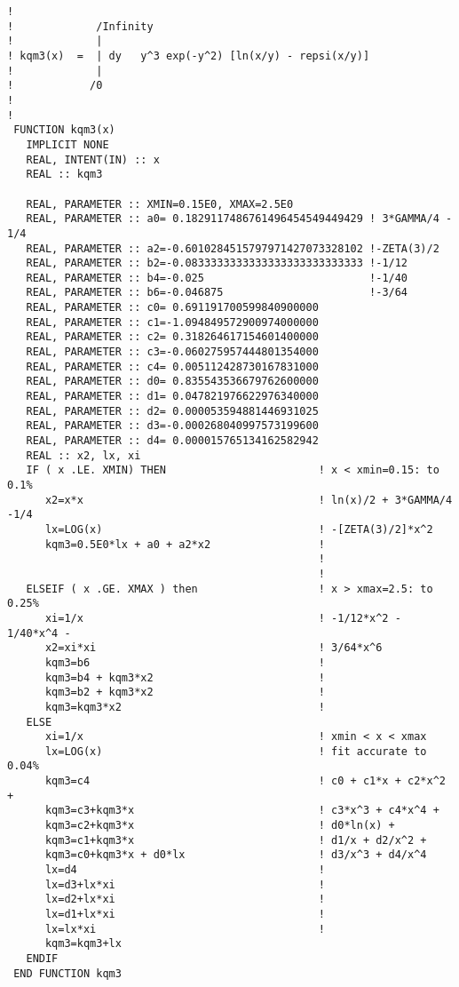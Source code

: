 \documentclass[preprint,12pt,eqsecnum,nofootinbib,amsmath,amssymb]{revtex4}
\begin{document}
{\begin{verbatim}
!
!             /Infinity
!             |
! kqm3(x)  =  | dy   y^3 exp(-y^2) [ln(x/y) - repsi(x/y)]
!             |
!            /0
!
!
 FUNCTION kqm3(x)  
   IMPLICIT NONE
   REAL, INTENT(IN) :: x
   REAL :: kqm3

   REAL, PARAMETER :: XMIN=0.15E0, XMAX=2.5E0 
   REAL, PARAMETER :: a0= 0.1829117486761496454549449429 ! 3*GAMMA/4 - 1/4
   REAL, PARAMETER :: a2=-0.6010284515797971427073328102 !-ZETA(3)/2
   REAL, PARAMETER :: b2=-0.0833333333333333333333333333 !-1/12
   REAL, PARAMETER :: b4=-0.025                          !-1/40
   REAL, PARAMETER :: b6=-0.046875                       !-3/64
   REAL, PARAMETER :: c0= 0.691191700599840900000
   REAL, PARAMETER :: c1=-1.094849572900974000000
   REAL, PARAMETER :: c2= 0.318264617154601400000
   REAL, PARAMETER :: c3=-0.060275957444801354000
   REAL, PARAMETER :: c4= 0.005112428730167831000
   REAL, PARAMETER :: d0= 0.835543536679762600000
   REAL, PARAMETER :: d1= 0.047821976622976340000
   REAL, PARAMETER :: d2= 0.000053594881446931025
   REAL, PARAMETER :: d3=-0.000268040997573199600
   REAL, PARAMETER :: d4= 0.000015765134162582942
   REAL :: x2, lx, xi
   IF ( x .LE. XMIN) THEN                        ! x < xmin=0.15: to 0.1%
      x2=x*x                                     ! ln(x)/2 + 3*GAMMA/4 -1/4
      lx=LOG(x)                                  ! -[ZETA(3)/2]*x^2
      kqm3=0.5E0*lx + a0 + a2*x2                 ! 
                                                 ! 
                                                 !
   ELSEIF ( x .GE. XMAX ) then                   ! x > xmax=2.5: to 0.25%
      xi=1/x                                     ! -1/12*x^2 - 1/40*x^4 -
      x2=xi*xi                                   ! 3/64*x^6
      kqm3=b6                                    !
      kqm3=b4 + kqm3*x2                          !
      kqm3=b2 + kqm3*x2                          !
      kqm3=kqm3*x2                               !
   ELSE
      xi=1/x                                     ! xmin < x < xmax
      lx=LOG(x)                                  ! fit accurate to 0.04%
      kqm3=c4                                    ! c0 + c1*x + c2*x^2 +
      kqm3=c3+kqm3*x                             ! c3*x^3 + c4*x^4 +
      kqm3=c2+kqm3*x                             ! d0*ln(x) +
      kqm3=c1+kqm3*x                             ! d1/x + d2/x^2 +
      kqm3=c0+kqm3*x + d0*lx                     ! d3/x^3 + d4/x^4
      lx=d4                                      !
      lx=d3+lx*xi                                !
      lx=d2+lx*xi                                !
      lx=d1+lx*xi                                !
      lx=lx*xi                                   !
      kqm3=kqm3+lx
   ENDIF
 END FUNCTION kqm3


\end{verbatim}}
\end{document}
